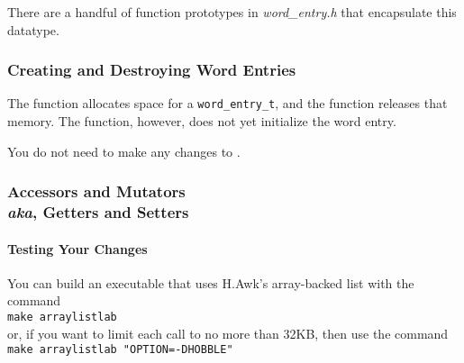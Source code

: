     There are a handful of function prototypes in \textit{word\_entry.h} that encapsulate this datatype.

    \subsubsection{Creating and Destroying Word Entries}

        The  function allocates space for a \lstinline{word_entry_t}, and the  function releases that memory.
        The  function, however, does not yet initialize the word entry.

        \begin{description}
        \end{description}

        You do not need to make any changes to .

    \subsubsection{Accessors and Mutators \\ \footnotesize{\textit{aka}, Getters and Setters}}

        \begin{description}
        \end{description}

    \paragraph{Testing Your Changes}

        You can build an executable that uses H.Awk's array-backed list with the command \\
        \verb+make arraylistlab+ \\
        or, if you want to limit each  call to no more than 32KB, then use the command \\
        \verb+make arraylistlab "OPTION=-DHOBBLE"+

